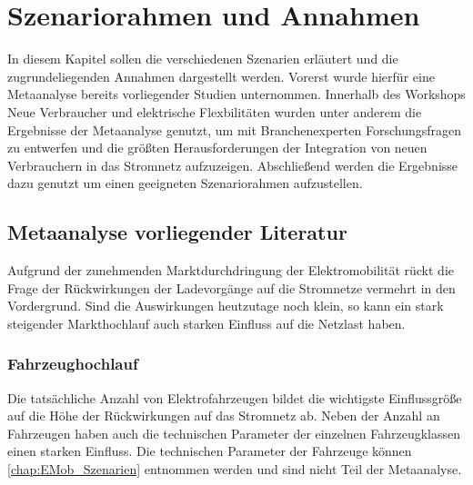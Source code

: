 
\section{Szenariorahmen und Annahmen}\label{chap:Szenariorahmen}

In diesem Kapitel sollen die verschiedenen Szenarien erläutert und die zugrundeliegenden Annahmen dargestellt werden.
Vorerst wurde hierfür eine Metaanalyse bereits vorliegender Studien unternommen.
Innerhalb des Workshops \glqq Neue Verbraucher und elektrische Flexbilitäten\grqq{} wurden unter anderem die Ergebnisse der Metaanalyse genutzt, um mit Branchenexperten Forschungsfragen zu entwerfen und die größten Herausforderungen der Integration von neuen Verbrauchern in das Stromnetz aufzuzeigen.
Abschließend werden die Ergebnisse dazu genutzt um einen geeigneten Szenariorahmen aufzustellen.

\subsection{Metaanalyse vorliegender Literatur}\label{chap:Metaanalyse}

Aufgrund der zunehmenden Marktdurchdringung der Elektromobilität rückt die Frage der Rückwirkungen der Ladevorgänge auf die Stromnetze vermehrt in den Vordergrund.
Sind die Auswirkungen heutzutage noch klein, so kann ein stark steigender Markthochlauf auch starken Einfluss auf die Netzlast haben.

\subsubsection{Fahrzeughochlauf}

Die tatsächliche Anzahl von Elektrofahrzeugen bildet die wichtigste Einflussgröße auf die Höhe der Rückwirkungen auf das Stromnetz ab.
Neben der Anzahl an Fahrzeugen haben auch die technischen Parameter der einzelnen Fahrzeugklassen einen starken Einfluss.
Die technischen Parameter der Fahrzeuge können \autoref{chap:EMob_Szenarien} entnommen werden und sind nicht Teil der Metaanalyse.



